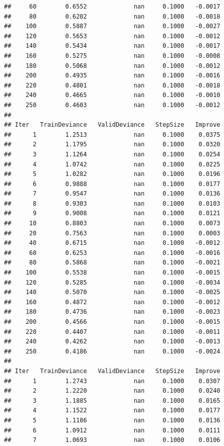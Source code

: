 \documentclass[]{book}
\begin{document}
\begin{verbatim}
##     60        0.6552             nan     0.1000   -0.0017
##     80        0.6202             nan     0.1000   -0.0018
##    100        0.5887             nan     0.1000   -0.0027
##    120        0.5653             nan     0.1000   -0.0012
##    140        0.5434             nan     0.1000   -0.0017
##    160        0.5275             nan     0.1000   -0.0008
##    180        0.5068             nan     0.1000   -0.0012
##    200        0.4935             nan     0.1000   -0.0016
##    220        0.4801             nan     0.1000   -0.0018
##    240        0.4665             nan     0.1000   -0.0010
##    250        0.4603             nan     0.1000   -0.0012
## 
## Iter   TrainDeviance   ValidDeviance   StepSize   Improve
##      1        1.2513             nan     0.1000    0.0375
##      2        1.1795             nan     0.1000    0.0320
##      3        1.1264             nan     0.1000    0.0254
##      4        1.0742             nan     0.1000    0.0225
##      5        1.0282             nan     0.1000    0.0196
##      6        0.9888             nan     0.1000    0.0177
##      7        0.9547             nan     0.1000    0.0136
##      8        0.9303             nan     0.1000    0.0103
##      9        0.9008             nan     0.1000    0.0121
##     10        0.8803             nan     0.1000    0.0073
##     20        0.7563             nan     0.1000    0.0003
##     40        0.6715             nan     0.1000   -0.0012
##     60        0.6253             nan     0.1000   -0.0016
##     80        0.5868             nan     0.1000   -0.0021
##    100        0.5538             nan     0.1000   -0.0015
##    120        0.5285             nan     0.1000   -0.0034
##    140        0.5070             nan     0.1000   -0.0025
##    160        0.4872             nan     0.1000   -0.0012
##    180        0.4736             nan     0.1000   -0.0023
##    200        0.4566             nan     0.1000   -0.0015
##    220        0.4407             nan     0.1000   -0.0011
##    240        0.4262             nan     0.1000   -0.0013
##    250        0.4186             nan     0.1000   -0.0024
## 
## Iter   TrainDeviance   ValidDeviance   StepSize   Improve
##      1        1.2743             nan     0.1000    0.0307
##      2        1.2220             nan     0.1000    0.0240
##      3        1.1885             nan     0.1000    0.0165
##      4        1.1522             nan     0.1000    0.0177
##      5        1.1186             nan     0.1000    0.0136
##      6        1.0912             nan     0.1000    0.0111
##      7        1.0693             nan     0.1000    0.0106

\end{verbatim}
\end{document}
